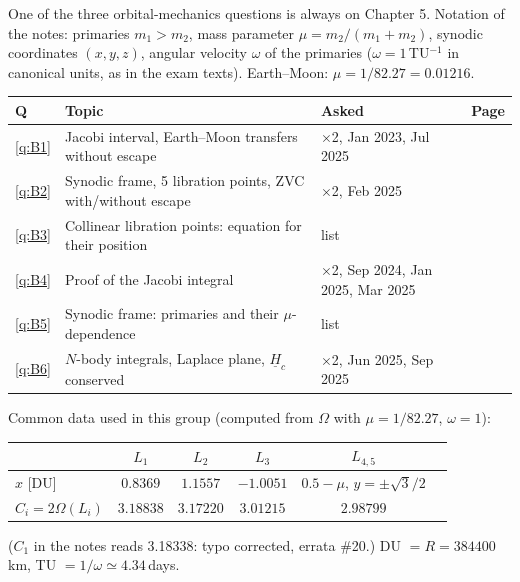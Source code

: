 
One of the three orbital-mechanics questions is always on Chapter 5. Notation of the notes: primaries $m_1>m_2$, mass
parameter $\mu=m_2/(m_1+m_2)$, synodic coordinates $(x,y,z)$, angular velocity $\omega$ of the primaries ($\omega=1$\,TU$^{-1}$
in canonical units, as in the exam texts). Earth--Moon: $\mu=1/82.27=0.01216$.

\begin{center}
\small
\begin{tabular}{@{}lllr@{}}
\toprule
Q & Topic & Asked & Page\\
\midrule
\ref{q:B1} & Jacobi interval, Earth--Moon transfers without escape & $\times$2, Jan 2023, Jul 2025 & \pageref{q:B1}\\
\ref{q:B2} & Synodic frame, 5 libration points, ZVC with/without escape & $\times$2, Feb 2025 & \pageref{q:B2}\\
\ref{q:B3} & Collinear libration points: equation for their position & list & \pageref{q:B3}\\
\ref{q:B4} & Proof of the Jacobi integral & $\times$2, Sep 2024, Jan 2025, Mar 2025 & \pageref{q:B4}\\
\ref{q:B5} & Synodic frame: primaries and their $\mu$-dependence & list & \pageref{q:B5}\\
\ref{q:B6} & $N$-body integrals, Laplace plane, $\underline H_c$ conserved & $\times$2, Jun 2025, Sep 2025 & \pageref{q:B6}\\
\bottomrule
\end{tabular}
\end{center}

Common data used in this group (computed from $\Omega$ with $\mu=1/82.27$, $\omega=1$):
\begin{center}
\small
\begin{tabular}{@{}lccccc@{}}
\toprule
 & $L_1$ & $L_2$ & $L_3$ & $L_{4,5}$\\
\midrule
$x$ [DU] & $0.8369$ & $1.1557$ & $-1.0051$ & $0.5-\mu$, $y=\pm\sqrt3/2$\\
$C_i=2\Omega(L_i)$ & $3.18838$ & $3.17220$ & $3.01215$ & $2.98799$\\
\bottomrule
\end{tabular}
\end{center}
{\footnotesize ($C_1$ in the notes reads 3.18338: typo corrected, errata \#20.) DU $=R=384400$\,km, TU $=1/\omega\simeq4.34$\,days.}

